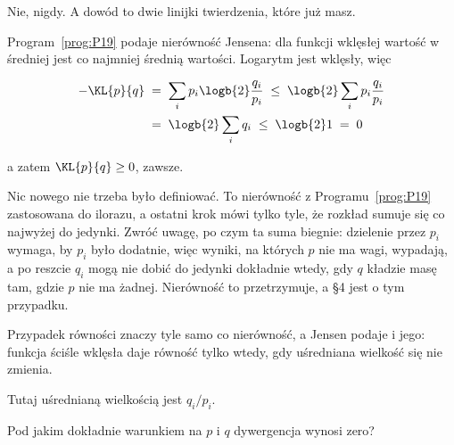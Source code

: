 \begin{fr}
\begin{ansblock}
Nie, nigdy. A dowód to dwie linijki twierdzenia, które już masz.

Program~\ref{prog:P19} podaje nierówność Jensena: dla funkcji wklęsłej
wartość w średniej jest co najmniej średnią wartości. Logarytm jest wklęsły,
więc

\begin{align*}
  -\KL{p}{q} &\;=\; \sum_i p_i \logb{2}\frac{q_i}{p_i}
              \;\le\; \logb{2} \sum_i p_i \frac{q_i}{p_i} \\
              &\;=\; \logb{2} \sum_i q_i \;\le\; \logb{2} 1 \;=\; 0
\end{align*}

a zatem $\KL{p}{q} \ge 0$, zawsze.
\end{ansblock}

Nic nowego nie trzeba było definiować. To nierówność z
Programu~\ref{prog:P19} zastosowana do ilorazu, a ostatni krok mówi tylko
tyle, że rozkład sumuje się co najwyżej do jedynki. Zwróć uwagę, po czym ta
suma biegnie: dzielenie przez $p_i$ wymaga, by $p_i$ było dodatnie, więc
wyniki, na których $p$ nie ma wagi, wypadają, a po reszcie $q_i$ mogą nie
dobić do jedynki \dash{} dokładnie wtedy, gdy $q$ kładzie masę tam, gdzie $p$
nie ma żadnej. Nierówność to przetrzymuje, a §4 jest o tym przypadku.
\end{fr}

\begin{fr}
Przypadek równości znaczy tyle samo co nierówność, a Jensen podaje i jego:
funkcja ściśle wklęsła daje równość tylko wtedy, gdy uśredniana wielkość się
nie zmienia.

Tutaj uśrednianą wielkością jest $q_i/p_i$.

Pod jakim dokładnie warunkiem na $p$ i $q$ dywergencja wynosi zero?
\dotline
\nextframe
\end{fr}


